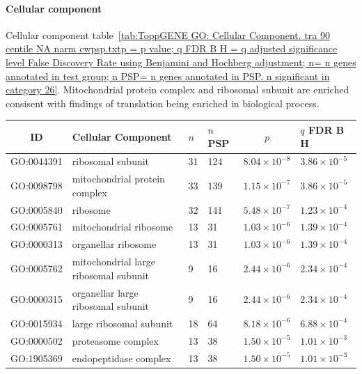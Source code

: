 \paragraph{Cellular component}

Cellular component table~\ref{tab:ToppGENE GO: Cellular Component. tra 90 centile NA narm cwpsp.txtp = p value; q FDR B H = q adjusted significance level False Discovery Rate using Benjamini and Hochberg adjustment; n= n genes annotated in test group; n PSP= n genes annotated in PSP. n significant in category 26}. Mitochondrial protein complex and ribosomal subunit are enriched consisent with findings of translation being enriched in biological process.

  \begin{table}[ht]
\centering
\begin{adjustbox}{width=\textwidth}
\setlength{\extrarowheight}{2pt}
\begin{tabular}{@{}clllcl@{}}
  \toprule
  ID & Cellular Component & $n$ & $n$ PSP & $p$ & $q$ FDR B H \\ 

  \midrule
GO:0044391 & ribosomal subunit & 31 & 124 & $8.04 \times 10^{-8}$ & $3.86 \times 10^{-5}$ \\ 
  GO:0098798 & mitochondrial protein complex & 33 & 139 & $1.15 \times 10^{-7}$ & $3.86 \times 10^{-5}$ \\ 
  GO:0005840 & ribosome & 32 & 141 & $5.48 \times 10^{-7}$ & $1.23 \times 10^{-4}$ \\ 
  GO:0005761 & mitochondrial ribosome & 13 & 31 & $1.03 \times 10^{-6}$ & $1.39 \times 10^{-4}$ \\ 
  GO:0000313 & organellar ribosome & 13 & 31 & $1.03 \times 10^{-6}$ & $1.39 \times 10^{-4}$ \\ 
  GO:0005762 & mitochondrial large ribosomal subunit & 9 & 16 & $2.44 \times 10^{-6}$ & $2.34 \times 10^{-4}$ \\ 
  GO:0000315 & organellar large ribosomal subunit & 9 & 16 & $2.44 \times 10^{-6}$ & $2.34 \times 10^{-4}$ \\ 
  GO:0015934 & large ribosomal subunit & 18 & 64 & $8.18 \times 10^{-6}$ & $6.88 \times 10^{-4}$ \\ 
  GO:0000502 & proteasome complex & 13 & 38 & $1.50 \times 10^{-5}$ & $1.01 \times 10^{-3}$ \\ 
  GO:1905369 & endopeptidase complex & 13 & 38 & $1.50 \times 10^{-5}$ & $1.01 \times 10^{-3}$ \\ 
   \hline
\bottomrule


\end{tabular}
\end{adjustbox}
\end{table}
